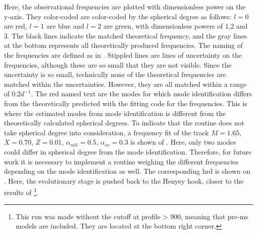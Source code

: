  
 
 
 
 Here, the observational frequencies are plotted with dimensionless power on the y-axis. They color-coded are color-coded by the spherical degree as follows: $l=0$ are red, $l=1$ are blue and  $l=2$ are green, with dimensionless powers of 1,2 and 3. The black lines indicate the matched theoretical frequency, and the gray lines at the bottom represents all theoretically produced frequencies. The naming of the frequencies are defined as in . Stippled lines are lines of uncertainty on the frequencies, although these are so small that they are not visible. Since the uncertainty is so small, technically none of the theoretical frequencies are matched within the uncertainties. However, they are all matched within a range of $0.2 d^{-1}$. The red named text are the modes for which mode identification differs from the theoretically predicted with the \chis fitting code for the frequencies. This is where the estimated modes from mode identification is different from the theoretically calculated spherical degrees. To indicate that the routine does not take spherical degree into consideration, a frequency fit of the track $M=1.65$, $X=0.70$, $Z=0.01$, $\alpha_{mlt} = 0.5$, $\alpha_{ov}=0.3$ is shown of . Here, only two modes could differ in spherical degree from the mode identification. Therefore, for future work it is necessary to implement a routine weighing the different frequencies depending on the mode identification as well. The corresponding hrd is shown on . Here, the evolutionary stage is pushed back to the Henyey hook, closer to the results of \citet{lenz2010delta}\footnote{This run was made without the cutoff at profile > 900, meaning that pre-ms models are included. They are located at the bottom right corner.}.
 
